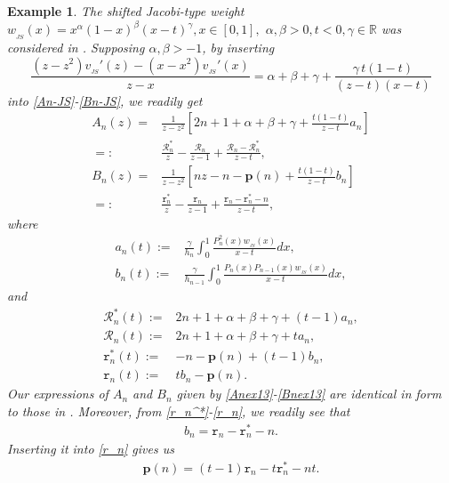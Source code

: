 \documentclass[12pt,a4paper]{article}    %
\newtheorem{exm}{Example}
\numberwithin{equation}{section}
\begin{document}
\begin{exm}\label{exJS-2}
The shifted Jacobi-type weight $w_{_{JS}}(x)=x^{\alpha}(1-x)^{\beta}(x-t)^{\gamma}, x\in[0,1],$ $\alpha,\beta>0, t<0,\gamma\in\mathbb{R}$ was considered in \cite{DZ10}. Supposing $\alpha,\beta>-1$, by inserting
\[\frac{(z-z^2)v_{_{JS}}'(z)-(x-x^2)v_{_{JS}}'(x)}{z-x}=\alpha +\beta +\gamma
   +\frac{\gamma\, t (1-t)
}{(z-t)(x-t)}
\]
into \eqref{An-JS}-\eqref{Bn-JS}, we readily get
\begin{align}
A_n(z)=&\frac{1}{z-z^2}\left[2n+1+\alpha+\beta+\gamma+\frac{t(1-t)}{z-t}a_n\right]\nonumber\\
=:&\frac{\mathcal{R}_n^*}{z}-\frac{\mathcal{R}_n}{z-1}+\frac{\mathcal{R}_n-\mathcal{R}_n^*}{z-t},\label{Anex13}\\
B_n(z)=&\frac{1}{z-z^2}\left[nz-n-\mathbf{p}(n)+\frac{t(1-t)}{z-t}b_n\right]\nonumber\\
=:&\frac{\texttt{r}_n^*}{z}-\frac{\texttt{r}_n}{z-1}+\frac{\texttt{r}_n-\texttt{r}_n^*-n}{z-t},\label{Bnex13}
\end{align}
where
\begin{align*}	 a_n(t):=&\frac{\gamma}{h_n}\int_0^1\frac{P_n^2(x)w_{_{JS}}(x)}{x-t}dx,\\
b_n(t):=&\frac{\gamma}{h_{n-1}}\int_0^1\frac{P_n(x)P_{n-1}(x)w_{_{JS}}(x)}{x-t}dx,
\end{align*}
and
\begin{align}	
\mathcal{R}_n^*(t):=&2n+1+\alpha+\beta+\gamma+(t-1)a_n,\label{R_n^*}\\
\mathcal{R}_n(t):=&2n+1+\alpha+\beta+\gamma+ta_n,\label{R_n}\\
\texttt{r}_n^*(t):=&-n-\mathbf{p}(n)+(t-1)b_n,\label{r_n^*}\\
\texttt{r}_n(t):=&tb_n-\mathbf{p}(n).\label{r_n}
\end{align}
Our expressions of $A_n$ and $B_n$ given by \eqref{Anex13}-\eqref{Bnex13} are identical in form to those in \cite{DZ10}. Moreover, from \eqref{r_n^*}-\eqref{r_n}, we readily see that
\begin{align}\label{diffRnrn}
b_n =\texttt{r}_n-\texttt{r}_n^*-n.
\end{align}
Inserting it into \eqref{r_n} gives us
\begin{align}\label{p-ex13}
\mathbf{p}(n)=(t-1)\texttt{r}_n-t\texttt{r}_n^*-nt.
\end{align}


\end{exm}
\end{document}
